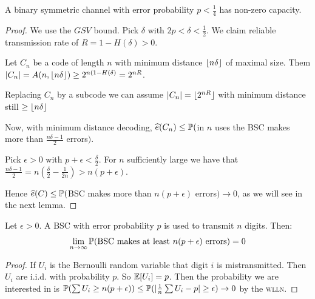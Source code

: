 \documentclass[10pt,a4paper]{article}
\begin{document}
\begin{proposition}
A binary symmetric channel with error probability $p < \frac{1}{4}$ has non-zero capacity.
\end{proposition}
\begin{proof}
We use the $GSV$ bound. Pick $\delta$ with $2p <\delta  < \frac12$. We claim reliable transmission rate of $R = 1-H(\delta) > 0$.

Let $C_n$ be a code of length $n$ with minimum distance $\floor{n\delta}$ of maximal size. Them $|C_n| = A(n, \floor{n\delta}) \geq 2^{n(1-H(\delta)} = 2^{nR}$.

Replacing $C_n$ by a subcode we can assume $|C_n| = \floor{2^{nR}}$ with minimum distance still $\geq \floor{n\delta}$

Now, with minimum distance decoding, $\hat{e}(C_n) \leq \P($in $n$ uses the BSC makes more than $\frac{n\delta-1}{2}$ errors$)$.

Pick $\epsilon > 0$ with $p+\epsilon < \frac{\delta}{2}$. For $n$ sufficiently large we have that $\frac{n\delta-1}{2} = n(\frac{\delta}{2} - \frac{1}{2n}) > n(p+\epsilon)$.

Hence $\hat{e}(C) \leq \P($BSC makes more than $n(p+\epsilon)$ errors$) \to 0$, as we will see in the next lemma.
\end{proof}
\begin{lemma}
Let $\epsilon > 0$. A BSC with error probability $p$ is used to transmit $n$ digits. Then:
\begin{align*}
\lim_{n \to \infty} \P(\text{BSC makes at least }n(p+\epsilon)\text{ errors}) = 0
\end{align*}
\end{lemma}
\begin{proof}
If $U_i$ is the Bernoulli random variable that digit $i$ is mistransmitted. Then $U_i$ are i.i.d. with probability $p$. So $\E[U_i] = p$. Then the probability we are interested in is $\P(\sum U_i \geq n(p+\epsilon)) \leq \P(|\frac{1}{n}\sum U_i -p| \geq \epsilon) \to 0$ by the \textsc{wlln}.
\end{proof}
\end{document}
